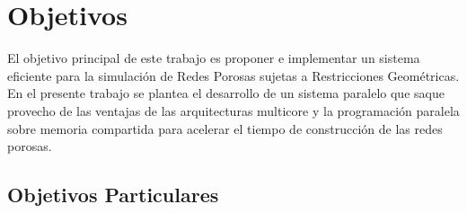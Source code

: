 \chapter{Objetivos}
\label{champ:objetivos}

El objetivo principal de  este trabajo es proponer e implementar un sistema eficiente para la simulaci\'on de Redes Porosas sujetas a Restricciones Geométricas.  En el presente trabajo se plantea el desarrollo de un sistema paralelo que saque provecho de las ventajas de las arquitecturas multicore y la programación paralela sobre memoria compartida para acelerar el tiempo de construcci\'on de las redes porosas.

\section{Objetivos Particulares}
\label{sec:objetivosp}
